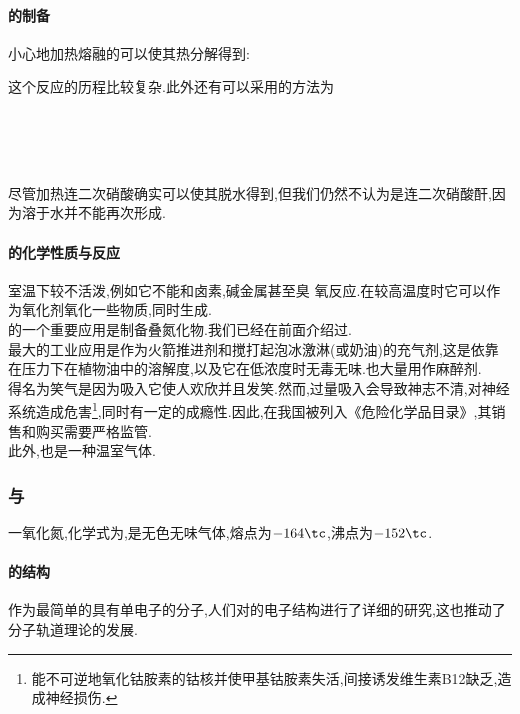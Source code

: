 \documentclass{ctexbook}
\begin{document}
\paragraph{的制备}
小心地加热熔融的可以使其热分解得到:
\begin{center}
\end{center}
这个反应的历程比较复杂.此外还有可以采用的方法为
\begin{center}
    \\
    \\
    \ \ \ \ \ 
\end{center}
尽管加热连二次硝酸确实可以使其脱水得到,但我们仍然不认为是连二次硝酸酐,因为溶于水并不能再次形成.
\paragraph{的化学性质与反应}
室温下较不活泼,例如它不能和卤素,碱金属甚至臭
氧反应.在较高温度时它可以作为氧化剂氧化一些物质,同时生成.\\
\indent {}的一个重要应用是制备叠氮化物.我们已经在前面介绍过.\\
\indent {}最大的工业应用是作为火箭推进剂和搅打起泡冰激淋(或奶油)的充气剂,这是依靠在压力下在植物油中的溶解度,以及它在低浓度时无毒无味.也大量用作麻醉剂.\\
\indent {}得名为笑气是因为吸入它使人欢欣并且发笑.然而,过量吸入会导致神志不清,对神经系统造成危害\footnote{能不可逆地氧化钴胺素的钴核并使甲基钴胺素失活,间接诱发维生素B12缺乏,造成神经损伤.},同时有一定的成瘾性.因此,在我国被列入《危险化学品目录》,其销售和购买需要严格监管.\\
\indent 此外,也是一种温室气体.
\subsubsection{与}
\begin{substance}[\ce{NO}]
    一氧化氮,化学式为,是无色无味气体,熔点为$-164\tc$,沸点为$-152\tc$.
\end{substance}
\paragraph{的结构}
作为最简单的具有单电子的分子,人们对的电子结构进行了详细的研究,这也推动了分子轨道理论的发展.
\end{document}
